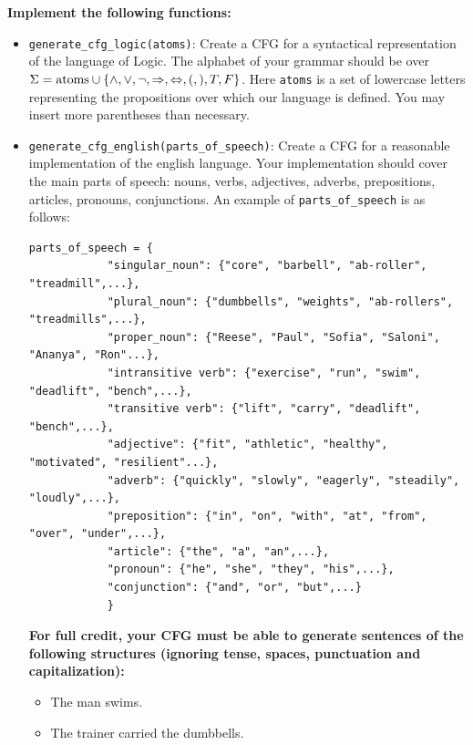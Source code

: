\documentclass{article}
\begin{document}
\begin{tcolorbox}[enhanced,interior style={top color=Dandelion!20,bottom color=Dandelion!30}]
    \textbf{Implement the following functions:}

    \begin{itemize}
        \item \lstinline{generate_cfg_logic(atoms)}: Create a CFG for a syntactical representation of the language of Logic. The alphabet of your grammar should be over $\Sigma = \text{\lstinline{atoms}} \cup \{\land, \lor, \neg, \Rightarrow, \Leftrightarrow, (, ), T, F\}$. Here \lstinline{atoms} is a set of lowercase letters representing the propositions over which our language is defined. You may insert more parentheses than necessary.
        \item
        \lstinline{generate_cfg_english(parts_of_speech)}: Create a CFG for a reasonable implementation of the english language.
        Your implementation should cover the main parts of speech: nouns, verbs, adjectives, adverbs, prepositions, articles, pronouns, conjunctions. An example of \lstinline{parts_of_speech} is as follows:
        \begin{lstlisting}[belowskip=-10pt]
        parts_of_speech = {
            "singular_noun": {"core", "barbell", "ab-roller", "treadmill",...},
            "plural_noun": {"dumbbells", "weights", "ab-rollers", "treadmills",...},
            "proper_noun": {"Reese", "Paul", "Sofia", "Saloni", "Ananya", "Ron"...},
            "intransitive verb": {"exercise", "run", "swim", "deadlift", "bench",...},
            "transitive verb": {"lift", "carry", "deadlift", "bench",...},
            "adjective": {"fit", "athletic", "healthy", "motivated", "resilient"...},
            "adverb": {"quickly", "slowly", "eagerly", "steadily", "loudly",...},
            "preposition": {"in", "on", "with", "at", "from", "over", "under",...},
            "article": {"the", "a", "an",...},
            "pronoun": {"he", "she", "they", "his",...},
            "conjunction": {"and", "or", "but",...}
            }
            \end{lstlisting}
            \textbf{For full credit, your CFG must be able to generate sentences of the following structures (ignoring tense, spaces, punctuation and capitalization):}
            \begin{itemize}
                \item The man swims.
                \item The trainer carried the dumbbells.

\end{itemize}
\end{itemize}
\end{tcolorbox}
\end{document}
